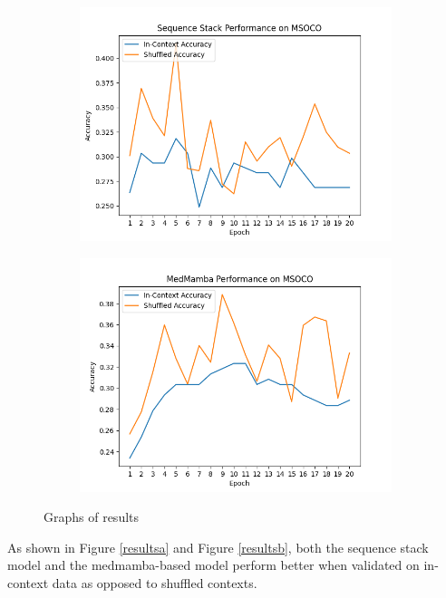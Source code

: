 \begin{figure}[!ht]
\begin{subfigure}{0.5\textwidth}
        \includegraphics[width=\textwidth]{figures/sequence_stack_mscoco.png}
        \caption{}
        \label{resultse}
    \end{subfigure}\begin{subfigure}{0.5\textwidth}
        \includegraphics[width=\textwidth]{figures/medmamba_mscoco.png}
        \caption{}
        \label{resultsf}
    \end{subfigure}
    \caption{Graphs of results}
    \label{resultslide}
\end{figure}
As shown in Figure \ref{resultsa} and Figure \ref{resultsb}, both the sequence
stack model and the medmamba-based model perform better when validated on
in-context data as opposed to shuffled contexts.

